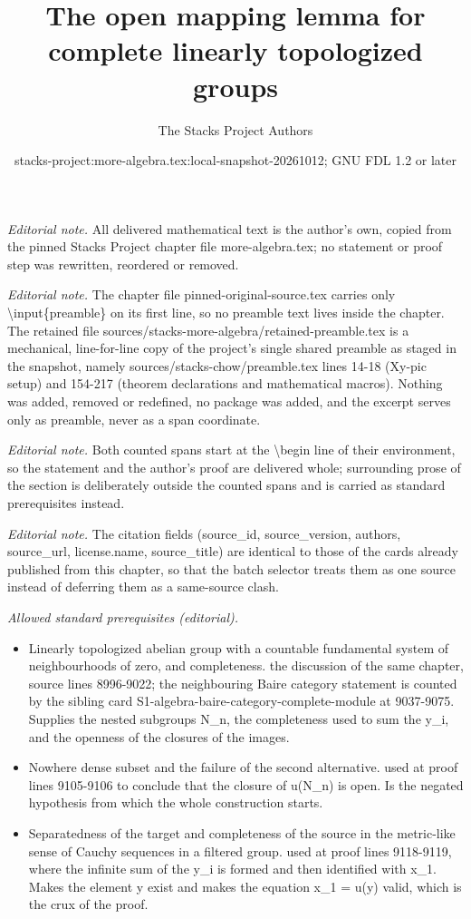 \documentclass[10pt,a4paper]{amsart}
\title{The open mapping lemma for complete linearly topologized groups}
\author{The Stacks Project Authors}
\date{stacks-project:more-algebra.tex:local-snapshot-20261012; GNU FDL 1.2 or later}
\theoremstyle{plain}
\theoremstyle{definition}
\theoremstyle{remark}
\numberwithin{equation}{subsection}
\begin{document}
\maketitle
\setcounter{subsection}{1}
\noindent\textit{Editorial note.} All delivered mathematical text is the author's own, copied from the pinned Stacks Project chapter file more-algebra.tex; no statement or proof step was rewritten, reordered or removed.\par\medskip
\noindent\textit{Editorial note.} The chapter file pinned-original-source.tex carries only \textbackslash{}input\{preamble\} on its first line, so no preamble text lives inside the chapter. The retained file sources/stacks-more-algebra/retained-preamble.tex is a mechanical, line-for-line copy of the project's single shared preamble as staged in the snapshot, namely sources/stacks-chow/preamble.tex lines 14-18 (Xy-pic setup) and 154-217 (theorem declarations and mathematical macros). Nothing was added, removed or redefined, no package was added, and the excerpt serves only as preamble, never as a span coordinate.\par\medskip
\noindent\textit{Editorial note.} Both counted spans start at the \textbackslash{}begin line of their environment, so the statement and the author's proof are delivered whole; surrounding prose of the section is deliberately outside the counted spans and is carried as standard prerequisites instead.\par\medskip
\noindent\textit{Editorial note.} The citation fields (source\_id, source\_version, authors, source\_url, license.name, source\_title) are identical to those of the cards already published from this chapter, so that the batch selector treats them as one source instead of deferring them as a same-source clash.\par\medskip
\noindent\textit{Allowed standard prerequisites (editorial).}\begin{itemize}
\item Linearly topologized abelian group with a countable fundamental system of neighbourhoods of zero, and completeness. the discussion of the same chapter, source lines 8996-9022; the neighbouring Baire category statement is counted by the sibling card S1-algebra-baire-category-complete-module at 9037-9075. Supplies the nested subgroups N\_n, the completeness used to sum the y\_i, and the openness of the closures of the images.
\item Nowhere dense subset and the failure of the second alternative. used at proof lines 9105-9106 to conclude that the closure of u(N\_n) is open. Is the negated hypothesis from which the whole construction starts.
\item Separatedness of the target and completeness of the source in the metric-like sense of Cauchy sequences in a filtered group. used at proof lines 9118-9119, where the infinite sum of the y\_i is formed and then identified with x\_1. Makes the element y exist and makes the equation x\_1 = u(y) valid, which is the crux of the proof.
\end{itemize}\medskip
\end{document}
